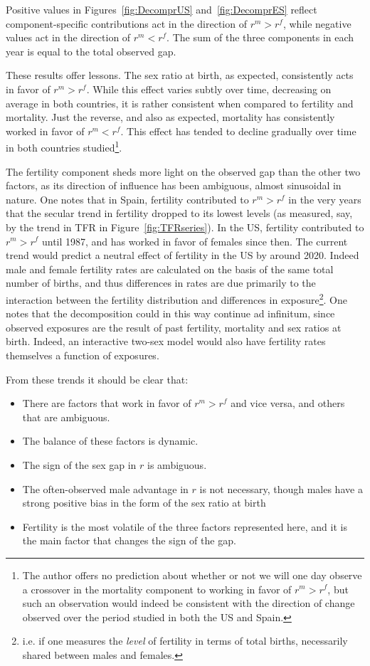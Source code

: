 Positive values in Figures~\ref{fig:DecomprUS} and~\ref{fig:DecomprES} reflect
component-specific contributions act in the direction of $r^m > r^f$, while
negative values act in the direction of $r^m < r^f$. The sum of the three
components in each year is equal to the total observed gap. 

These results offer lessons. The sex ratio at birth, as
expected, consistently acts in favor of $r^m > r^f$. While this effect varies
subtly over time, decreasing on average in both countries, it is rather
consistent when compared to fertility and mortality. Just the reverse, and 
also as expected, mortality has consistently worked in
favor of $r^m < r^f$. This effect has tended to decline gradually over time in
both countries studied\footnote{The author offers no prediction about whether or
not we will one day observe a crossover in the mortality component to working
in favor of $r^m > r^f$, but such an observation would indeed be consistent
with the direction of change observed over the period studied in both the US
and Spain.}. 

The fertility component sheds more light on the observed gap than
the other two factors, as its direction of influence has been ambiguous, almost
sinusoidal in nature. One notes that in Spain, fertility contributed to $r^m >
r^f$ in the very years that the secular trend in fertility dropped to its lowest 
levels (as measured, say, by the trend
in TFR in Figure~\ref{fig:TFRseries}). In the US, fertility contributed to $r^m
> r^f$ until 1987, and has worked in favor of females since then. The current
trend would predict a neutral effect of fertility in the US by around 2020.
Indeed male and female fertility rates are calculated on the basis of the same
total number of births, and thus differences in rates are due primarily to the
interaction between the fertility distribution and differences in
exposure\footnote{i.e. if one measures the \textit{level} of fertility in
terms of total births, necessarily shared between males and females.}. One notes
that the decomposition could in this way continue ad infinitum, since 
observed exposures are the result of past fertility, mortality and sex
 ratios at birth. Indeed, an interactive two-sex model would also have fertility rates
themselves a function of exposures.

From these trends it should be clear that:
\begin{itemize}
  \item There are factors that work in favor of $r^m
> r^f$ and vice versa, and others that are ambiguous.
  \item The balance of these factors is dynamic.
  \item The sign of the sex gap in $r$ is ambiguous.
  \item The often-observed male advantage in $r$
is not necessary, though males have a strong positive bias in the form of the
sex ratio at birth
  \item Fertility is the most volatile of the three factors represented here,
  and it is the main factor that changes the sign of the gap.
\end{itemize}

